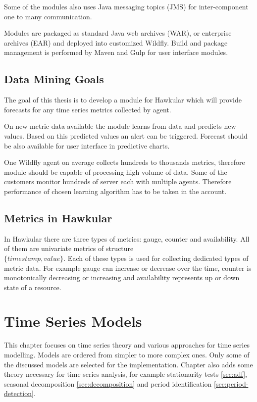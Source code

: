     Some of the modules also uses Java messaging topics (JMS) for inter-component one to many communication.

    Modules are packaged as standard Java web archives (WAR), or enterprise archives (EAR) and deployed into
    customized Wildfly. Build and package management is performed by Maven and Gulp for user interface modules.

    \section{Data Mining Goals} \label{sec:goals}
    The goal of this thesis is to develop a module for Hawkular which will provide forecasts for any time series
    metrics collected by agent.

    On new metric data available the module learns from data and predicts new values. Based on this predicted values
    an alert can be triggered. Forecast should be also available for user interface in predictive charts.

    One Wildfly agent on average collects hundreds to thousands metrics, therefore module should be capable of
    processing high volume of data. Some of the customers monitor hundreds of server each with multiple agents.
    Therefore performance of chosen learning algorithm has to be taken in the account.

    \section{Metrics in Hawkular} \label{sec:metrics-in-hawkular}
    In Hawkular there are three types of metrics: gauge, counter and availability. All of them are univariate metrics
    of structure \\$\{timestamp, value\}$. Each of these types is used for collecting dedicated types of metric data.
    For example gauge can increase or decrease over the time, counter is monotonically decreasing or increasing and
    availability represents up or down state of a resource.

\chapter{Time Series Models} \label{chap:models}
This chapter focuses on time series theory and various approaches for time series modelling. Models are
ordered from simpler to more complex ones. Only some of the discussed models are selected for the implementation.
Chapter also adds some theory necessary for time series analysis, for example stationarity tests \ref{sec:adf},
seasonal decomposition \ref{sec:decomposition} and period identification \ref{sec:period-detection}.

